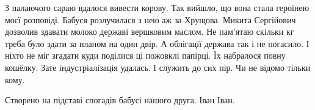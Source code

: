 З палаючого сараю вдалося вивести корову.  Так вийшло, що вона стала героїнею
моєї розповіді.  Бабуся розлучилася з нею аж за Хрущова.  Микита Сергійович
дозволив здавати молоко державі вершковим маслом.  Не пам'ятаю скільки кг треба
було здати за планом на один двір.  А облігації держава так і не погасило.  І
ніхто не міг згадати куди поділися ці пожовклі папірці.  Їх набралося повну
кошёлку.  Зате індустріалізація удалась. І служить до сих пір.  Чи не відомо
тільки кому.

Створено на підставі спогадів бабусі нашого друга. Іван Іван.


